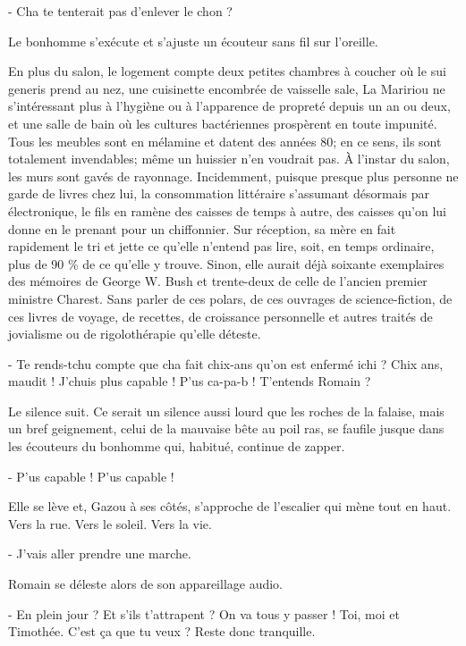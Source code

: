 - Cha te tenterait pas d’enlever le chon ?

Le bonhomme s’exécute et s’ajuste un écouteur sans fil sur l’oreille.

En plus du salon, le logement compte deux petites chambres à coucher où le sui generis prend au nez, une cuisinette encombrée de vaisselle sale, La Maririou ne s’intéressant plus à l’hygiène ou à l’apparence de propreté depuis un an ou deux, et une salle de bain où les cultures bactériennes prospèrent en toute impunité. Tous les meubles sont en mélamine et datent des années 80; en ce sens, ils sont totalement invendables; même un huissier n’en voudrait pas. À l’instar du salon, les murs sont gavés de rayonnage. Incidemment, puisque presque plus personne ne garde de livres chez lui, la consommation littéraire s’assumant désormais par électronique, le fils en ramène des caisses de temps à autre, des caisses qu’on lui donne en le prenant pour un chiffonnier. Sur réception, sa mère en fait rapidement le tri et jette ce qu’elle n’entend pas lire, soit, en temps ordinaire, plus de 90 \% de ce qu’elle y trouve. Sinon, elle aurait déjà soixante exemplaires des mémoires de George W. Bush et trente-deux de celle de l’ancien premier ministre Charest. Sans parler de ces polars, de ces ouvrages de science-fiction, de ces livres de voyage, de recettes, de croissance personnelle et autres traités de jovialisme ou de rigolothérapie qu’elle déteste.

- Te rends-tchu compte que cha fait chix-ans qu’on est enfermé ichi ? Chix ans, maudit ! J’chuis plus capable ! P’us ca-pa-b ! T’entends Romain ?

Le silence suit. Ce serait un silence aussi lourd que les roches de la falaise, mais un bref geignement, celui de la mauvaise bête au poil ras, se faufile jusque dans les écouteurs du bonhomme qui, habitué, continue de zapper.

- P’us capable ! P’us capable !

Elle se lève et, Gazou à ses côtés, s’approche de l’escalier qui mène tout en haut. Vers la rue. Vers le soleil. Vers la vie.

- J’vais aller prendre une marche.

Romain se déleste alors de son appareillage audio.

- En plein jour ? Et s’ils t’attrapent ? On va tous y passer ! Toi, moi et Timothée. C’est ça que tu veux ? Reste donc tranquille.

